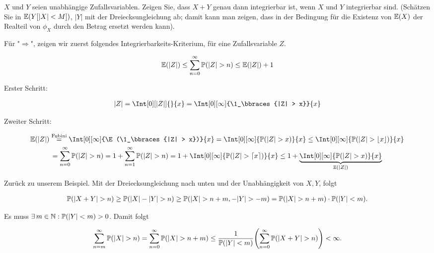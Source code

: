 \begin{exercise}
$X$ und $Y$ seien unabhängige Zufallsvariablen. Zeigen Sie, dass $X + Y$ genau
dann integrierbar ist, wenn $X$ und $Y$ integrierbar sind. (Schätzen Sie in
$\E(Y[|X| < M])$, $|Y|$ mit der Dreiecksungleichung ab; damit kann man
zeigen, dass in der Bedingung für die Existenz von $\E(X)$ der Realteil
von $\phi_X$ durch den Betrag ersetzt werden kann).
\end{exercise}

\begin{solution}

Für "$\Rightarrow$", zeigen wir zuerst folgendes Integrierbarkeits-Kriterium, für eine Zufallsvariable $Z$.

\begin{align*}
  \E(|Z|) \leq
  \sum_{n=0}^\infty \P(|Z| > n) \leq
  \E(|Z|) + 1
\end{align*}

Erster Schritt:

\begin{align*}
  |Z|
  = \Int[0][|Z|]{}{x}
  = \Int[0][\infty]{\1_\bbraces{|Z| > x}}{x}
\end{align*}

Zweiter Schritt:

\begin{multline*}
  \E(|Z|)
  \stackrel{\text{Fubini}}{=}
    \Int[0][\infty]{\E(\1_\bbraces{|Z| > x})}{x}
  = \Int[0][\infty]{\P(|Z| > x)}{x}
  \leq
    \Int[0][\infty]{\P(|Z| > \floor{x})}{x} \\
  = \sum_{n=0}^\infty \P(|Z| > n)
  = 1 + \sum_{n=1}^\infty \P(|Z| > n)
  = 1 + \Int[0][\infty]{\P(|Z| > \ceil{x})}{x}
  \leq
    1 + \underbrace{\Int[0][\infty]{\P(|Z| > x)}{x}}_{\E(|Z|)}
\end{multline*}

Zurück zu unserem Beispiel. Mit der Dreiecksungleichung nach unten und der Unabhängigkeit von $X, Y$, folgt

\begin{align*}
  \P(|X + Y| > n)
  \geq
    \P(|X| - |Y| > n)
  \geq
    \P(|X| > n + m, -|Y| > -m)
  = \P(|X| > n + m) \cdot \P(|Y| < m).
\end{align*}

Es muss $\Exists m \in \N: \P(|Y| < m) > 0$. Damit folgt

\begin{align*}
  \sum_{n=m}^\infty \P(|X| > n)
  = \sum_{n=0}^\infty \P(|X| > n + m)
  \leq
    \Frac
    {\P(|Y| < m)}
    {\sum_{n=0}^\infty \P(|X + Y| > n)}
  < \infty.
\end{align*}


\end{solution}
